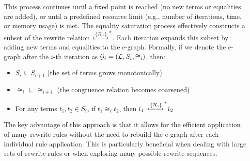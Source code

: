 This process continues until a fixed point is reached (no new terms or equalities are added), or until a predefined resource limit (e.g., number of iterations, time, or memory usage) is met.
The equality saturation process effectively constructs a subset of the rewrite relation $\xleftrightarrow[]{\{\mathcal{R}_i\}}^*$. 
Each iteration expands this subset by adding new terms and equalities to the e-graph.
Formally, if we denote the e-graph after the $i$-th iteration as $\mathcal{G}_i = (\mathcal{L}, S_i, \cong_i)$, then:

\begin{itemize}
    \item $S_i \subseteq S_{i+1}$ (the set of terms grows monotonically)
    \item $\mathcal{\cong}_i \subseteq \mathcal{\cong}_{i+1}$ (the congruence relation becomes coarsened)
    \item For any terms $t_1, t_2 \in S_i$, if $t_1 \mathcal{\cong}_i t_2$, then $t_1 {} \,\xleftrightarrow[]{\{\mathcal{R}_i\}}^*\! {t}_2$
\end{itemize}

The key advantage of this approach is that it allows for the efficient application of many rewrite rules without the need to rebuild the e-graph after each individual rule application. This is particularly beneficial when dealing with large sets of rewrite rules or when exploring many possible rewrite sequences.

